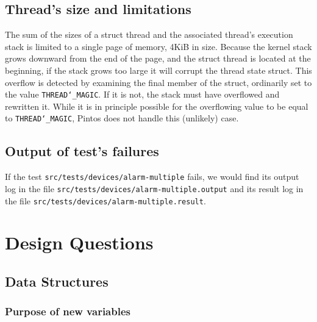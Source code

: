 \documentclass{article}
\renewcommand{\_}{\char`_}
\begin{document}
\subsection{Thread's size and limitations}
The sum of the sizes of a struct thread and the associated thread's
execution stack is limited to a single page of memory, 4KiB in size.
Because the kernel stack grows downward from the end of the page, and
the struct thread is located at the beginning, if the stack grows too
large it will corrupt the thread state struct.  This overflow is
detected by examining the final member of the struct, ordinarily set
to the value \texttt{THREAD\char`_MAGIC}.  If it is not, the stack must have
overflowed and rewritten it.  While it is in principle possible for
the overflowing value to be equal to \texttt{THREAD\char`_MAGIC}, Pintos does not
handle this (unlikely) case.

\subsection{Output of test's failures}
If the test \texttt{src/tests/devices/alarm-multiple} fails, we would find its output 
log in the file \newline \texttt{src/tests/devices/alarm-multiple.output} and its result log in the 
file \newline \texttt{src/tests/devices/alarm-multiple.result}.
\newpage

\section{Design Questions}
\subsection{Data Structures}
\subsubsection{Purpose of new variables}
\end{document}
